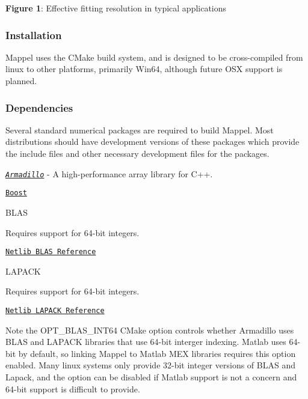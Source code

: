 {\bfseries Figure 1}\+: Effective fitting resolution in typical applications 

\subsubsection*{Installation}

Mappel uses the C\+Make build system, and is designed to be cross-\/compiled from linux to other platforms, primarily Win64, although future O\+SX support is planned.

\subsubsection*{Dependencies}

Several standard numerical packages are required to build Mappel. Most distributions should have development versions of these packages which provide the include files and other necessary development files for the packages.


\begin{DoxyItemize}
\item \href{http://arma.sourceforge.net/docs.html}{\tt {\itshape Armadillo}} -\/ A high-\/performance array library for C++.
\item \href{http://www.boost.org/}{\tt Boost}
\item B\+L\+AS
\begin{DoxyItemize}
\item Requires support for 64-\/bit integers.
\item \href{http://www.netlib.org/blas/}{\tt Netlib B\+L\+AS Reference}
\end{DoxyItemize}
\item L\+A\+P\+A\+CK
\begin{DoxyItemize}
\item Requires support for 64-\/bit integers.
\item \href{http://www.netlib.org/lapack/}{\tt Netlib L\+A\+P\+A\+CK Reference}
\end{DoxyItemize}
\end{DoxyItemize}

Note the {\ttfamily O\+P\+T\+\_\+\+B\+L\+A\+S\+\_\+\+I\+N\+T64} C\+Make option controls whether Armadillo uses B\+L\+AS and L\+A\+P\+A\+CK libraries that use 64-\/bit interger indexing. Matlab uses 64-\/bit by default, so linking Mappel to Matlab M\+EX libraries requires this option enabled. Many linux systems only provide 32-\/bit integer versions of B\+L\+AS and Lapack, and the option can be disabled if Matlab support is not a concern and 64-\/bit support is difficult to provide.

